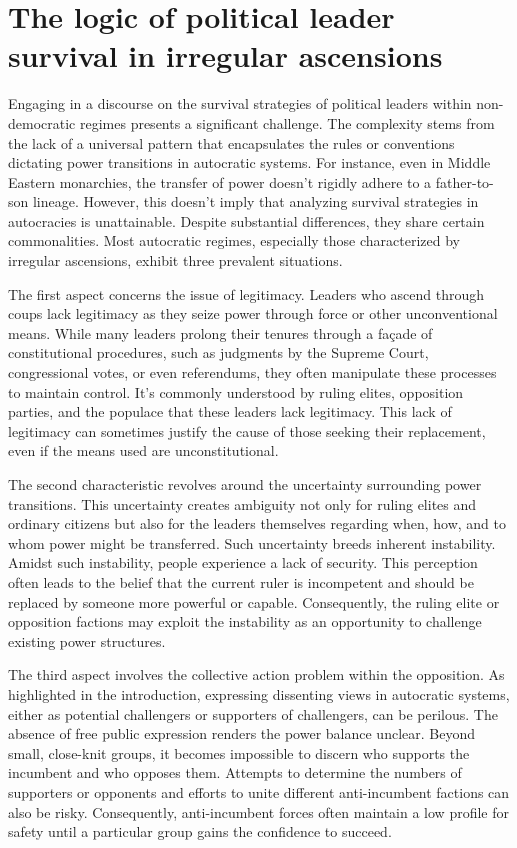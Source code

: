 \documentclass[
  12pt,
  a4paper,
  12pt]{article}
\begin{document}
\hypertarget{the-logic-of-political-leader-survival-in-irregular-ascensions}{%
\section{The logic of political leader survival in irregular
ascensions}\label{the-logic-of-political-leader-survival-in-irregular-ascensions}}

Engaging in a discourse on the survival strategies of political leaders
within non-democratic regimes presents a significant challenge. The
complexity stems from the lack of a universal pattern that encapsulates
the rules or conventions dictating power transitions in autocratic
systems. For instance, even in Middle Eastern monarchies, the transfer
of power doesn't rigidly adhere to a father-to-son lineage. However,
this doesn't imply that analyzing survival strategies in autocracies is
unattainable. Despite substantial differences, they share certain
commonalities. Most autocratic regimes, especially those characterized
by irregular ascensions, exhibit three prevalent situations.

The first aspect concerns the issue of legitimacy. Leaders who ascend
through coups lack legitimacy as they seize power through force or other
unconventional means. While many leaders prolong their tenures through a
façade of constitutional procedures, such as judgments by the Supreme
Court, congressional votes, or even referendums, they often manipulate
these processes to maintain control. It's commonly understood by ruling
elites, opposition parties, and the populace that these leaders lack
legitimacy. This lack of legitimacy can sometimes justify the cause of
those seeking their replacement, even if the means used are
unconstitutional.

The second characteristic revolves around the uncertainty surrounding
power transitions. This uncertainty creates ambiguity not only for
ruling elites and ordinary citizens but also for the leaders themselves
regarding when, how, and to whom power might be transferred. Such
uncertainty breeds inherent instability. Amidst such instability, people
experience a lack of security. This perception often leads to the belief
that the current ruler is incompetent and should be replaced by someone
more powerful or capable. Consequently, the ruling elite or opposition
factions may exploit the instability as an opportunity to challenge
existing power structures.

The third aspect involves the collective action problem within the
opposition. As highlighted in the introduction, expressing dissenting
views in autocratic systems, either as potential challengers or
supporters of challengers, can be perilous. The absence of free public
expression renders the power balance unclear. Beyond small, close-knit
groups, it becomes impossible to discern who supports the incumbent and
who opposes them. Attempts to determine the numbers of supporters or
opponents and efforts to unite different anti-incumbent factions can
also be risky. Consequently, anti-incumbent forces often maintain a low
profile for safety until a particular group gains the confidence to
succeed.
\end{document}
